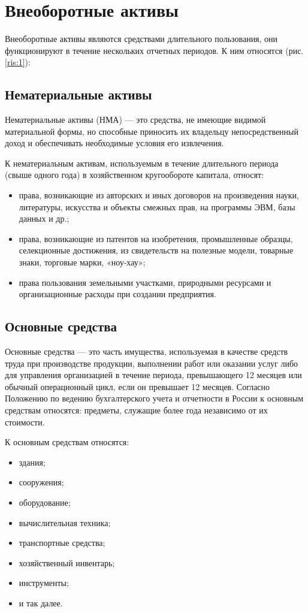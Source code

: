 \documentclass[a4paper,14pt]{extarticle}
\begin{document}
 \section{Внеоборотные активы}
 
 Внеоборотные активы являются средствами длительного пользования, они функционируют в течение нескольких отчетных периодов. К ним относятся (рис. \ref{ris:1}):
 
 \subsection{Нематериальные активы}
 
 Нематериальные активы (НМА) — это средства, не имеющие видимой материальной формы, но способные приносить их владельцу непосредственный доход и обеспечивать необходимые условия его извлечения.
 
 К нематериальным активам, используемым в течение длительного периода (свыше одного года) в хозяйственном кругообороте капитала, относят:
 
 \begin{itemize}
 	\item права, возникающие из авторских и иных договоров на произведения науки, литературы, искусства и объекты смежных прав, на программы ЭВМ, базы данных и др.;
 	\item права, возникающие из патентов на изобретения, промышленные образцы, селекционные достижения, из свидетельств на полезные модели, товарные знаки, торговые марки, «ноу-хау»;
 	\item права пользования земельными участками, природными ресурсами и организационные расходы при создании предприятия.
 \end{itemize}
 
 \subsection{Основные средства}
 
 Основные средства — это часть имущества, используемая в качестве средств труда при производстве продукции, выполнении работ или оказании услуг либо для управления организацией в течение периода, превышающего 12 месяцев или обычный операционный цикл, если он превышает 12 месяцев. Согласно Положению по ведению бухгалтерского учета и отчетности в России к основным средствам относятся: предметы, служащие более года независимо от их стоимости.
 
 К основным средствам относятся: 
 \begin{itemize}
 	\item здания;
 	\item сооружения;
 	\item оборудование;
 	\item вычислительная техника;
 	\item транспортные средства;
 	\item хозяйственный инвентарь;
 	\item инструменты;
 	\item и так далее.
 \end{itemize}
\end{document}
